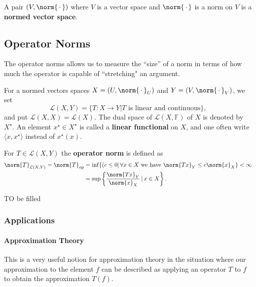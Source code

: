 \documentclass[main.tex]{subfiles}
\begin{document}
\begin{definition}
A pair $(V, \norm{\,\cdot \,})$ where $V$ is a vector space and $\norm{\, \cdot \,}$ is a norm on $V$ is a \textbf{normed vector space}.
\end{definition}


\subsection{Operator Norms}
The operator norms allows us to measure the 
``size'' of a norm in terms of how much the operator is capable of ``stretching" an argument.
\begin{definition}
For a normed vectors spaces $X = (U,\norm{\, \cdot \,}_U)$ and $Y = (V,\norm{\, \cdot \,}_V)$, we set
\begin{equation}
    \mathcal{L}(X,Y) = \{ T: X \rightarrow Y | T  \text{ is linear and continuous} \},
\end{equation}
and put $\mathcal{L}(X,X) = \mathcal{L}(X)$. The dual space of $\mathcal{L}(X,\mathbb{F})$ of $X$ is denoted by $X^\star$. An element $x^\star \in X^\star$ is called a \textbf{linear functional} on $X$, and one often write $\langle x,x^\star \rangle$ instead of $x^\star (x)$.

For $T \in \mathcal{L}(X,Y)$ the \textbf{operator norm} is defined as 
\begin{align}
    \norm{T}_{\mathcal{L}(X,Y)} = \norm{T}_{op}
    &= \inf\{(c \leq 0 |\, \forall x \in X \text{ we have } \norm{Tx}_Y \leq c \norm{x}_X \} < \infty \\
    &= \sup\left\{ \frac{\norm{Tx}_Y}{\norm{x}_X } \, | \, x \in X \right\}.
\end{align}
\end{definition}

\begin{prop}
TO be filled
\end{prop}

\subsubsection{Applications}
\paragraph{Approximation Theory}
This is a very useful notion for approximation theory in the situation where our approximation to the element $f$ can be described as applying an operator $T$ to $f$ to obtain the approximation $T(f)$.
\end{document}
